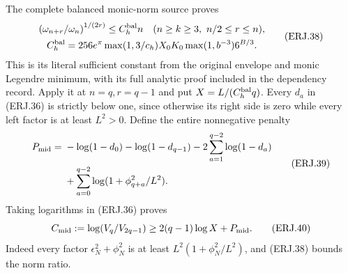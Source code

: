 \documentclass[11pt]{article}
\begin{document}
The complete balanced monic-norm source proves
\[
 \begin{gathered}
 \left(\omega_{n+r}/\omega_n\right)^{1/(2r)}
 \le C_h^{\rm bal}n\quad(n\ge k\ge3,\ n/2\le r\le n),
 \\
 C_h^{\rm bal}=256e^\pi\max(1,3/c_h)X_0K_0
                       \max(1,b^{-3})6^{B/3}.
 \end{gathered}
 \tag{ERJ.38}
\]
This is its literal sufficient constant from the original envelope and
monic Legendre minimum, with its full analytic proof included in the
dependency record. Apply it at $n=q,r=q-1$ and put
$X=L/(C_h^{\rm bal}q)$. Every $d_a$ in (ERJ.36) is strictly
below one, since otherwise its right side is zero while every left
factor is at least $L^2>0$. Define the entire nonnegative penalty
\[
\begin{split}
 P_{\rm mid}={}&-\log(1-d_0)-\log(1-d_{q-1})
 -2\sum_{a=1}^{q-2}\log(1-d_a)\\
 &+\sum_{a=0}^{q-2}\log(1+\phi_{q+a}^2/L^2).
\end{split}\tag{ERJ.39}
\]
Taking logarithms in (ERJ.36) proves
\[
 C_{\rm mid}:=\log(V_q/V_{2q-1})
       \ge2(q-1)\log X+P_{\rm mid}.\tag{ERJ.40}
\]
Indeed every factor $\epsilon_N^2+\phi_N^2$ is at least
$L^2(1+\phi_N^2/L^2)$, and (ERJ.38) bounds the norm ratio.
\end{document}
